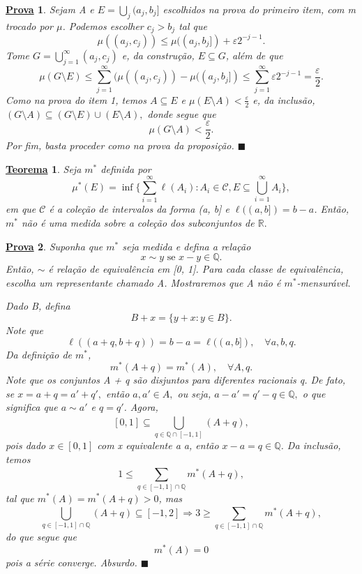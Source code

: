 \documentclass{article}
\newtheorem*{theorem*}{\underline{Teorema}}
\newtheorem*{proof*}{\underline{Prova}}
\renewcommand\qedsymbol{$\blacksquare$}
\begin{document}
\begin{proof*}
  Sejam A e \(E = \bigcup_{j}^{}(a_{j}, b_{j}]\) escolhidos na prova do primeiro item, com m trocado por \(\mu \). Podemos escolher \(c_{j} > b_{j}\) tal que 
    \[
      \mu ((a_{j}, c_{j})) \leq \mu ((a_{j}, b_{j}]) + \varepsilon 2^{-j-1}.
    \]
  Tome \(G = \bigcup_{j=1}^{\infty}(a_{j}, c_{j})\) e, da construção, \(E\subseteq G\), além de que 
    \[
      \mu (G\setminus{E}) \leq \sum\limits_{j=1}^{\infty}(\mu ((a_{j}, c_{j})) - \mu ((a_{j}, b_{j}]) \leq \sum\limits_{j=1}^{\infty}\varepsilon 2^{-j-1} = \frac{\varepsilon }{2}.
    \] 
  Como na prova do item 1, temos \(A\subseteq E\) e \(\mu (E\setminus{A}) < \frac{\varepsilon }{2}\) e, da inclusão, \((G\setminus{A})\subseteq (G\setminus{E})\cup (E\setminus{A}),\) donde segue que 
    \[
      \mu (G\setminus{A}) < \frac{\varepsilon }{2}.
    \]
  Por fim, basta proceder como na prova da proposição. \qedsymbol
\end{proof*}
\begin{theorem*}
  Seja \(m^{*}\) definida por 
    \[
      \mu ^{*}(E) = \inf_{}\biggl\{\sum\limits_{i=1}^{\infty}\ell (A_{i}): A_{i}\in \mathcal{C}, E \subseteq \bigcup_{i=1}^{\infty}A_{i}\biggr\},
    \]
    em que \(\mathcal{C}\) é a coleção de intervalos da forma (a, b] e \(\ell ((a, b]) = b-a\). Então, \(m^{*}\) não é uma medida sobre a coleção dos subconjuntos de \(\mathbb{R}.\)
\end{theorem*}
\begin{proof*}
  Suponha que \(m^{*}\) seja medida e defina a relação 
    \[
      x\sim y \text{ se } x-y\in \mathbb{Q}.
    \]
    Então, \(\sim\) é relação de equivalência em [0, 1]. Para cada classe de equivalência, escolha um representante chamado A. Mostraremos que A não é \(m^{*}\)-mensurável.

    Dado B, defina 
      \[
        B + x = \{y + x: y\in B\}.
      \]
    Note que 
      \[
        \ell ((a+q, b+q)) = b-a = \ell ((a, b]),\quad \forall a, b, q.
      \]
    Da definição de \(m^{*}\), 
      \[
        m^{*}(A + q) = m^{*}(A),\quad \forall A, q.
      \]
    Note que os conjuntos A + q são disjuntos para diferentes racionais q. De fato, se \(x = a + q = a'+ q',\) então \(a, a'\in A,\) ou seja, \(a - a'= q'-q\in \mathbb{Q}, \) o que significa que 
    \(a \sim a'\) e \(q = q'\). Agora,
      \[
        [0, 1]\subseteq \bigcup_{q\in \mathbb{Q}\cap [-1, 1]}^{}(A+q),
      \]
    pois dado \(x\in [0,1]\) com x equivalente a a, então \(x-a = q\in \mathbb{Q}\). Da inclusão, temos 
      \[
        1 \leq \sum\limits_{q\in [-1, 1]\cap \mathbb{Q}}^{}m^{*}(A+q),
      \]
    tal que \(m^{*}(A) = m^{*}(A+q) > 0\), mas 
      \[
        \bigcup_{q\in [-1, 1]\cap \mathbb{Q}}^{}(A+q)\subseteq [-1, 2] \Rightarrow 3 \geq \sum\limits_{q\in [-1, 1]\cap \mathbb{Q}}^{}m^{*}(A+q),
      \]
    do que segue que 
      \[
        m^{*}(A) = 0
      \]
    pois a série converge. Absurdo. \qedsymbol
\end{proof*}
\end{document}
